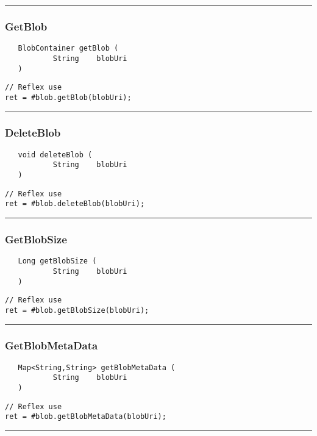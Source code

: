\rule{15cm}{2pt}
\subsubsection{GetBlob}
\label{Api:GetBlob}
\begin{verbatim}
   BlobContainer getBlob (
           String    blobUri
   )
\end{verbatim}
\begin{lstlisting}[language=reflex]
// Reflex use
ret = #blob.getBlob(blobUri);
\end{lstlisting}



\rule{15cm}{2pt}
\subsubsection{DeleteBlob}
\label{Api:DeleteBlob}
\begin{verbatim}
   void deleteBlob (
           String    blobUri
   )
\end{verbatim}
\begin{lstlisting}[language=reflex]
// Reflex use
ret = #blob.deleteBlob(blobUri);
\end{lstlisting}



\rule{15cm}{2pt}
\subsubsection{GetBlobSize}
\label{Api:GetBlobSize}
\begin{verbatim}
   Long getBlobSize (
           String    blobUri
   )
\end{verbatim}
\begin{lstlisting}[language=reflex]
// Reflex use
ret = #blob.getBlobSize(blobUri);
\end{lstlisting}



\rule{15cm}{2pt}
\subsubsection{GetBlobMetaData}
\label{Api:GetBlobMetaData}
\begin{verbatim}
   Map<String,String> getBlobMetaData (
           String    blobUri
   )
\end{verbatim}
\begin{lstlisting}[language=reflex]
// Reflex use
ret = #blob.getBlobMetaData(blobUri);
\end{lstlisting}



\rule{15cm}{2pt}
